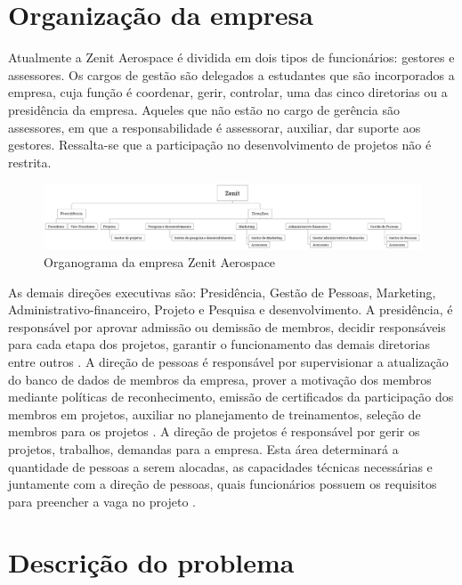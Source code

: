 \section{Organização da empresa}
Atualmente a Zenit Aerospace é dividida em dois tipos de funcionários: gestores e assessores. Os cargos de gestão são delegados a estudantes que são incorporados a empresa, cuja função é coordenar, gerir, controlar, uma das cinco diretorias ou a presidência da empresa. Aqueles que não estão no cargo de gerência são assessores, em que a responsabilidade é assessorar, auxiliar, dar suporte aos gestores. Ressalta-se que a participação no desenvolvimento de projetos não é restrita.
\begin{figure}[h]
	\centering
	\label{zenitOrganograma}
    \includegraphics[keepaspectratio=true,scale=0.3]{figuras/zenitOrganograma.eps}
	\caption{Organograma da empresa Zenit Aerospace}
\end{figure}
As demais direções executivas são: Presidência, Gestão de Pessoas, Marketing, Administrativo-financeiro, Projeto e Pesquisa e desenvolvimento.
A presidência, é responsável por aprovar admissão ou demissão de membros, decidir responsáveis para cada etapa dos projetos, garantir o funcionamento das demais diretorias entre outros \cite{regimentoZenit}. 
A direção de pessoas é responsável por supervisionar a atualização do banco de dados de membros da empresa, prover a motivação dos membros mediante políticas de reconhecimento, emissão de certificados da participação dos membros em projetos, auxiliar no planejamento de treinamentos, seleção de membros para os projetos \cite{regimentoZenit}. 
A direção de projetos é responsável por gerir os projetos, trabalhos, demandas para a empresa. Esta área determinará a quantidade de pessoas a serem alocadas, as capacidades técnicas necessárias e juntamente com a direção de pessoas, quais funcionários possuem os requisitos para preencher a vaga no projeto \cite{regimentoZenit}.

\section[Descrição do problema]{Descrição do problema}\label{descricaoProblema}

